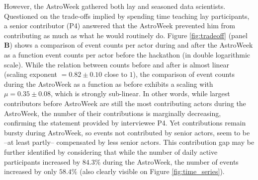 However, the AstroWeek gathered both lay and seasoned data scientists. Questioned on the trade-offs implied by spending time teaching lay participants, a senior contributor (P4) answered that the AstroWeek prevented him from contributing as much as what he would routinely do. Figure \ref{fig:tradeoff} (panel {\bf B}) shows a comparison of event counts per actor during and after the AstroWeek as a function event counts per actor before the hackathon (in double logarithmic scale). While the relation between counts before and after is almost linear (scaling exponent $= 0.82\pm0.10$ close to $1$), the comparison of event counts during the AstroWeek as a function as before exhibits a scaling with $\mu = 0.35\pm0.08$, which is strongly sub-linear. In other words, while largest contributors before AstroWeek are still the most contributing actors during the AstroWeek, the number of their contributions is marginally decreasing, confirming the statement provided by interviewee P4. Yet contributions remain bursty during AstroWeek, so events not contributed by senior actors, seem to be --at least partly-- compensated by less senior actors. This contribution gap may be further identified by considering that while the number of daily active participants increased by $84.3\%$ during the AstroWeek, the number of events increased by only $58.4\%$ (also clearly visible on Figure \ref{fig:time_series}).

